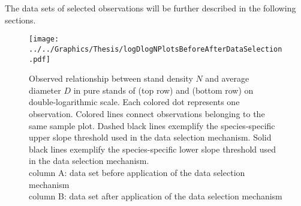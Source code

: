 The data sets of selected observations will be further described in the following sections.



\begin{figure}[H]
  \centering
  \texttt{[image: ../../Graphics/Thesis/logDlogNPlotsBeforeAfterDataSelection.pdf]}
  \caption{Observed relationship between stand density \(N\) and average diameter \(D\) in pure stands of \Beech{} (top row) and \Spruce{} (bottom row) on double-logarithmic scale.  Each colored dot represents one observation.  Colored lines connect observations belonging to the same sample plot.  Dashed black lines exemplify the species-specific upper slope threshold used in the data selection mechanism.  Solid black lines exemplify the species-specific lower slope threshold used in the data selection mechanism.  \\
    column A: data set before application of the data selection mechanism \\
    column B: data set after application of the data selection mechanism}
  \label{fig:logNlogDPlotsBeforeAfterDataSelection}
\end{figure}

